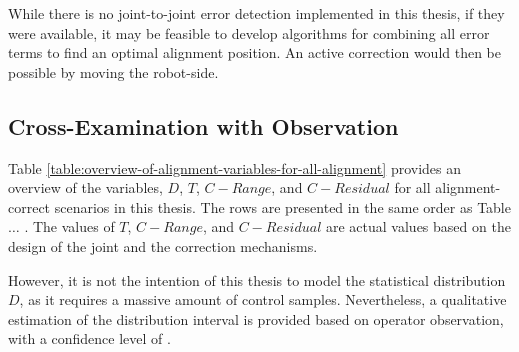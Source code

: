 While there is no joint-to-joint error detection implemented in this thesis, if they were available, it may be feasible to develop algorithms for combining all error terms to find an optimal alignment position. An active correction would then be possible by moving the robot-side.

\subsection{Cross-Examination with Observation}
\label{subsection:new-hypo-cross-examination-with-observation}

Table \ref{table:overview-of-alignment-variables-for-all-alignment} provides an overview of the variables, $D$, $T$, $C-{Range}$, and $C-{Residual}$ for all alignment-correct scenarios in this thesis. The rows are presented in the same order as Table $\ldots$ . The values of $T$, $C-{Range}$, and $C-{Residual}$ are actual values based on the design of the joint and the correction mechanisms. 

However, it is not the intention of this thesis to model the statistical distribution $D$, as it requires a massive amount of control samples. Nevertheless, a qualitative estimation of the distribution interval is provided based on operator observation, with a confidence level of .

